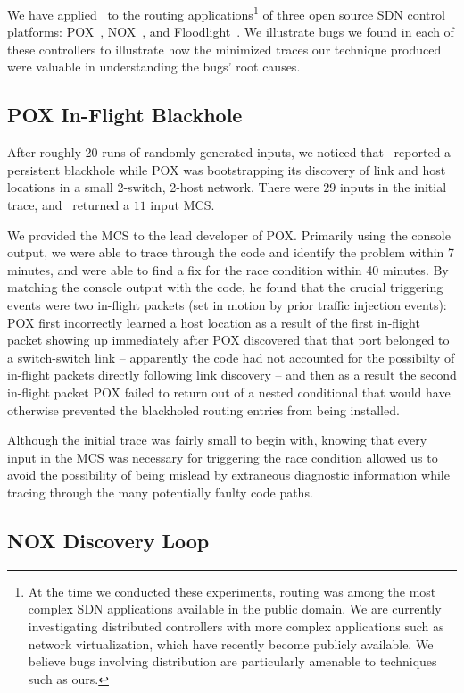 We have applied \projectname~to the routing applications\footnote{At the time
we conducted these experiments, routing was among the most complex
SDN applications available in the public domain. We are currently investigating
distributed controllers with more complex applications such as network virtualization,
which have recently become publicly available. We believe bugs involving
distribution are particularly amenable to techniques such as ours.} of three open
source SDN control platforms:
POX~\cite{pox}, NOX~\cite{nox}, and Floodlight~\cite{bigswitch}. We illustrate
bugs we found in each of these controllers to illustrate
how the minimized traces our technique produced were valuable in
understanding the bugs' root causes.

\subsection{POX In-Flight Blackhole}
After roughly 20 runs of randomly generated inputs,
we noticed that \projectname~reported a persistent blackhole while
POX was bootstrapping its
discovery of link and host locations in a small 2-switch, 2-host network.
There were $29$ inputs in the initial trace, and \projectname~returned a $11$ input
MCS.

We provided the MCS to the lead developer of POX. Primarily using the
console output, we were able to trace through the code and identify the problem
within 7 minutes, and were able to find a fix for the race condition within 40
minutes. By matching the console output with the code, he found that the crucial
triggering events were two
in-flight packets (set in motion by prior traffic injection events):
POX first incorrectly learned a host location as a result of the first in-flight
packet showing up immediately after POX discovered that that port belonged to
a switch-switch link -- apparently the code had not accounted for the
possibilty of in-flight packets directly following link discovery -- and
then as a result the
second in-flight packet
POX failed to return out of a nested conditional that would have
otherwise prevented the blackholed routing entries from being installed.

Although the initial trace was fairly small to begin with, knowing that every
input in the MCS was necessary for triggering the race condition allowed us to
avoid the
possibility of being mislead by extraneous diagnostic information while
tracing through the many potentially faulty code paths.

\subsection{NOX Discovery Loop}


